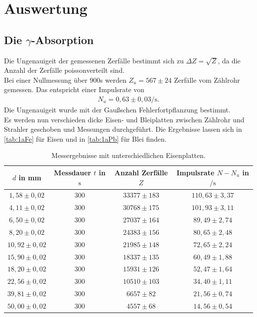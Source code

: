 \section{Auswertung}
\label{sec:Auswertung}
\subsection{Die $γ$-Absorption}

Die Ungenauigeit der gemessenen Zerfälle bestimmt sich zu $\Delta Z = \sqrt{Z}$, da die Anzahl der Zerfälle
poissonverteilt sind.\\
Bei einer Nullmessung über 900s werden $Z_u = 567 \pm 24$ Zerfälle vom Zählrohr gemessen. Das entspricht einer
Impulsrate von 
\begin{align*}
  N_u = 0,63 \pm 0,03 \si{\per\second}.
\end{align*}
Die Ungenauigeit wurde mit der Gaußschen Fehlerfortpflanzung bestimmt.\\
Es werden nun verschieden dicke Eisen- und Bleiplatten zwischen Zählrohr und Strahler geschoben und Messungen 
durchgeführt. Die Ergebnisse lassen sich in \autoref{tab:1aFe} für Eisen und in \autoref{tab:1aPb} für Blei finden.\\
\begin{table}
  \centering
  \caption{Messergebnisse mit unterschiedlichen Eisenplatten.}
  \label{tab:1aFe}
  \begin{tabular}{c c c c}
    $d$ in \si{\milli\meter} & Messdauer $t$ in $\si{\second}$ & Anzahl Zerfälle $Z$  &  Impulsrate $N-N_u$ in $\si{\per\second}$\\
       \midrule
        $1,58 \pm 0,02$   &  300   &  $33377 \pm 183$ & $110,63 \pm 3,37$ \\
        $4,11 \pm 0,02$   &  300   &  $30768 \pm 175$ & $101,93 \pm 3,11$\\
        $6,50 \pm 0,02$   &  300   &  $27037 \pm 164$ & $89,49 \pm 2,74$\\
        $8,20 \pm 0,02$   &  300   &  $24383 \pm 156$ & $80,65 \pm 2,48$\\
        $10,92 \pm 0,02$  &  300   &  $21985 \pm 148$ & $72,65 \pm 2,24$\\
        $15,90 \pm 0,02$  &  300   &  $18337 \pm 135$ & $60,49 \pm 1,88$\\
        $18,20 \pm 0,02$  &  300   &  $15931 \pm 126$ & $52,47 \pm 1,64$\\
        $22,56 \pm 0,02$  &  300   &  $10510 \pm 103$ & $34,40 \pm 1,11$\\
        $39,81 \pm 0,02$  &  300   &  $ 6657 \pm 82$ & $21,56 \pm 0,74$\\
        $50,00 \pm 0,02$  &  300   &  $ 4557 \pm 68$ & $14,56 \pm 0,54$\\
      \bottomrule
    \end{tabular}
\end{table}

